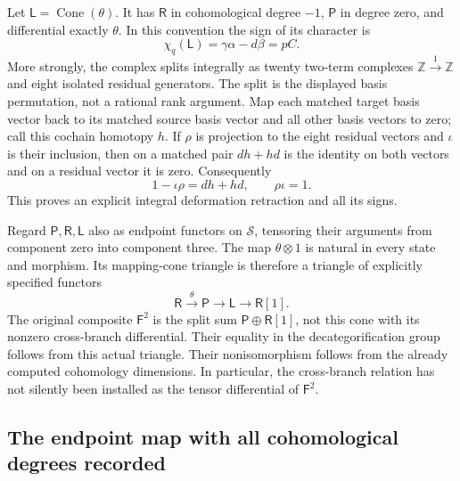 Let \(\mathsf L=\operatorname{Cone}(\theta)\). It has
\(\mathsf R\) in cohomological degree \(-1\), \(\mathsf P\) in
degree zero, and differential exactly \(\theta\). In this convention
the sign of its character is
\[
 \chi_q(\mathsf L)=\gamma\alpha-d\beta
                 =pC.
\]
More strongly, the complex splits integrally as twenty two-term
complexes \(\mathbb Z\xrightarrow{1}\mathbb Z\) and eight isolated
residual generators. The split is the displayed basis permutation,
not a rational rank argument. Map each matched target basis vector
back to its matched source basis vector and all other basis vectors
to zero; call this cochain homotopy \(h\). If \(\rho\) is projection
to the eight residual vectors and \(\iota\) is their inclusion, then
on a matched pair \(dh+hd\) is the identity on both vectors and on
a residual vector it is zero. Consequently
\[
                    1-\iota\rho=dh+hd,
                    \qquad \rho\iota=1.
\]
This proves an explicit integral deformation retraction and all its
signs.

Regard \(\mathsf P,\mathsf R,\mathsf L\) also as endpoint functors
on \(\mathcal S\), tensoring their arguments from component zero
into component three. The map \(\theta\otimes1\) is natural in
every state and morphism. Its mapping-cone triangle is therefore
a triangle of explicitly specified functors
\[
             \mathsf R\xrightarrow{\theta}\mathsf P
                    \longrightarrow\mathsf L\longrightarrow\mathsf R[1].
\]
The original composite \(\mathsf F^2\) is the split sum
\(\mathsf P\oplus\mathsf R[1]\), not this cone with its nonzero
cross-branch differential. Their equality in the decategorification
group follows from this actual triangle. Their nonisomorphism follows
from the already computed cohomology dimensions. In particular,
the cross-branch relation has not silently been installed as the
tensor differential of \(\mathsf F^2\).

\subsection{The endpoint map with all cohomological degrees recorded}

